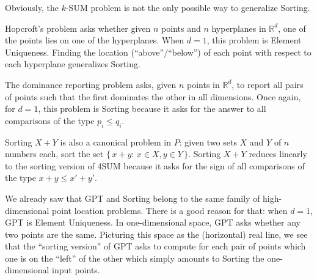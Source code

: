 Obviously, the \(k\)-SUM problem is not the only possible way to generalize
Sorting.

Hopcroft's problem asks whether given \(n\) points and \(n\) hyperplanes in
\(\mathbb{R}^d\), one of the points lies on one of the hyperplanes. When
\(d=1\), this problem is Element Uniqueness. Finding the location
(``above''/``below'')
of each point with respect to each hyperplane generalizes Sorting.

The dominance reporting problem asks, given \(n\) points in \(\mathbb{R}^d\),
to report all pairs of points such that the first dominates the other in all
dimensions. Once again, for \(d=1\), this problem is Sorting because it asks
for the answer to all comparisons of the type \(p_i \leq q_i\).

Sorting \(X+Y\) is also a canonical problem in \(P\): given two sets
\(X\) and \( Y \) of \( n \) numbers each, sort the set \( \{\, x + y \colon\,
x \in X, y \in Y\,\} \). Sorting \(X+Y\) reduces linearly to the sorting
version of 4SUM because it asks for the sign of all comparisons of the type
\(x+y \leq x'+y'\).

We already saw that GPT and Sorting belong to the same family of
high-dimensional point location problems. There is a good reason for that: when
\(d=1\), GPT is Element Uniqueness. In one-dimensional space, GPT
asks whether any two points are the same. Picturing this space as
the (horizontal) real line, we see that the ``sorting version'' of GPT asks to
compute for each pair of points which one is on the ``left'' of the other which
simply amounts to Sorting the one-dimensional input points.
